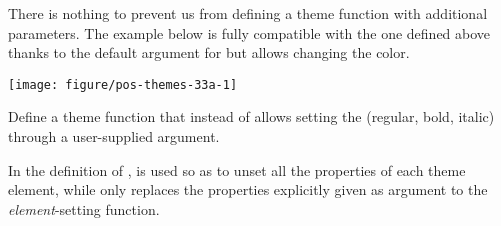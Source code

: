 \documentclass[krantz2]{krantz}\usepackage{knitr}%
\begin{document}
There is nothing to prevent us from defining a theme function with additional parameters. The example below is fully compatible with the one defined above thanks to the default argument for  but allows changing the color.

\begin{knitrout}\footnotesize
{}\color{fgcolor}\begin{kframe}
\begin{alltt}
 \hlkwb{<-}
     \hlstd{(} \hlstd{=} \hlstd{,}  \hlstd{=} \hlstd{,}  \hlstd{=} \hlstd{) \{}
        \hlstd{(}    \hlopt{+}
            \hlstd{(} \hlstd{=} \hlstd{(}   \hlstd{=} \hlstd{)}
    \hlstd{\}}
\end{alltt}
\end{kframe}
\end{knitrout}

\begin{knitrout}\footnotesize
{}\color{fgcolor}\begin{kframe}
\begin{alltt}
 \hlopt{+} \hlstd{(} \hlstd{=} \hlstd{)}
\end{alltt}
\end{kframe}

{\centering \texttt{[image: figure/pos-themes-33a-1]} 

}



\end{knitrout}

\begin{playground}
Define a theme function that instead of  allows setting the  (regular, bold, italic) through a user-supplied argument.
\end{playground}

\begin{warningbox}
In the definition of ,  is used so as to unset all the properties of each theme element, while \code{+} only replaces the properties explicitly given as argument to the \emph{element}-setting function.
\end{warningbox}
\end{document}
